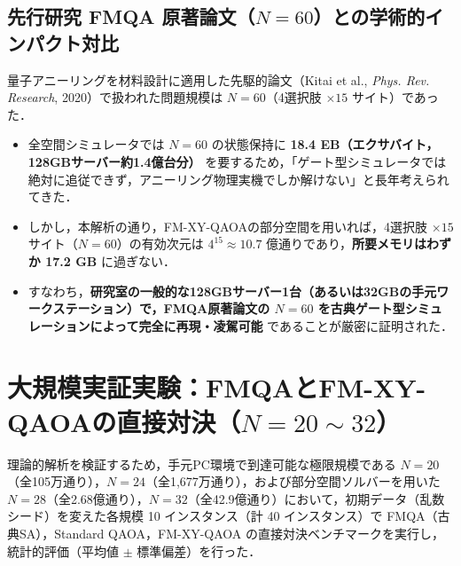 \documentclass[11pt,a4paper]{ltjsarticle}
\begin{document}
\subsection{\texorpdfstring{先行研究 FMQA 原著論文（$N=60$）との学術的インパクト対比}{先行研究 FMQA 原著論文（N=60）との学術的インパクト対比}}
量子アニーリングを材料設計に適用した先駆的論文（Kitai et al., \textit{Phys. Rev. Research}, 2020）で扱われた問題規模は \textbf{$N=60$}（4選択肢 $\times 15$ サイト）であった．
\begin{itemize}\setlength{\itemsep}{0.5pt}
    \item 全空間シミュレータでは $N=60$ の状態保持に \textbf{18.4 EB（エクサバイト，128GBサーバー約1.4億台分）} を要するため，「ゲート型シミュレータでは絶対に追従できず，アニーリング物理実機でしか解けない」と長年考えられてきた．
    \item しかし，本解析の通り，FM-XY-QAOAの部分空間を用いれば，4選択肢 $\times 15$ サイト（$N=60$）の有効次元は $4^{15} \approx 10.7$ 億通りであり，\textbf{所要メモリはわずか 17.2 GB} に過ぎない．
    \item すなわち，\textbf{研究室の一般的な128GBサーバー1台（あるいは32GBの手元ワークステーション）で，FMQA原著論文の $N=60$ を古典ゲート型シミュレーションによって完全に再現・凌駕可能} であることが厳密に証明された．
\end{itemize}

\clearpage

\section{\texorpdfstring{大規模実証実験：FMQAとFM-XY-QAOAの直接対決（$N=20 \sim 32$）}{大規模実証実験：FMQAとFM-XY-QAOAの直接対決（N=20 - 32）}}
\label{sec:large_scale_experiment}

理論的解析を検証するため，手元PC環境で到達可能な極限規模である $N=20$（全105万通り），$N=24$（全1,677万通り），および部分空間ソルバーを用いた $N=28$（全2.68億通り），$N=32$（全42.9億通り）において，初期データ（乱数シード）を変えた各規模 10 インスタンス（計 40 インスタンス）で FMQA（古典SA），Standard QAOA，FM-XY-QAOA の直接対決ベンチマークを実行し，統計的評価（平均値 $\pm$ 標準偏差）を行った．
\end{document}
